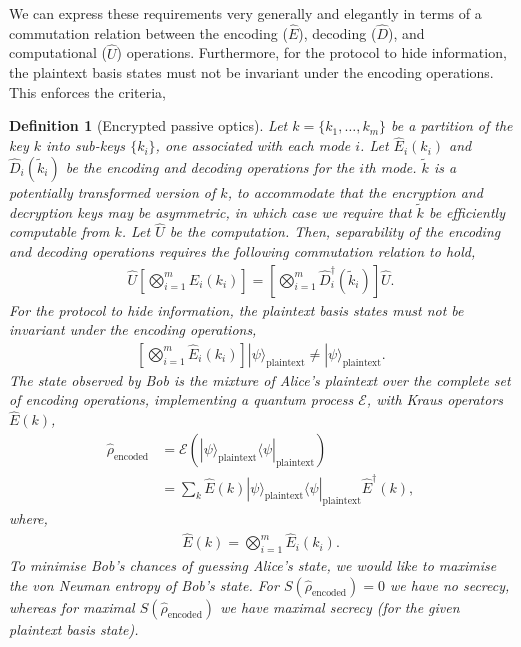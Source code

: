 \documentclass[aps, rmp, twocolumn, amsmath, amssymb, nofootinbib, superscriptaddress, longbibliography, floatfix, table-of-contents, eqsecnum]{revtex4-1}
\newcommand{\bra}[1]{\langle#1|}
\newcommand{\ket}[1]{|#1\rangle}
\newtheorem{definition}{Definition}
\begin{document}
We can express these requirements very generally and elegantly in terms of a commutation relation between the encoding ($\hat{E}$), decoding ($\hat{D}$), and computational ($\hat{U}$) operations. Furthermore, for the protocol to hide information, the plaintext basis states must not be invariant under the encoding operations. This enforces the criteria,
\begin{definition}[Encrypted passive optics] \label{def:enc_pass}
Let \mbox{$k=\{k_1,\dots,k_m\}$} be a partition of the key $k$ into sub-keys $\{k_i\}$, one associated with each mode $i$. Let $\hat{E}_i(k_i)$ and $\hat{D}_i(\tilde k_i)$ be the encoding and decoding operations for the $i$th mode. $\tilde k$ is a potentially transformed version of $k$, to accommodate that the encryption and decryption keys may be asymmetric, in which case we require that $\tilde{k}$ be efficiently computable from $k$. Let $\hat{U}$ be the computation. Then, separability of the encoding and decoding operations requires the following commutation relation to hold,
\begin{align} \label{eq:gen_pass_hom}
\hat{U} \left[\bigotimes_{i=1}^m\hat{E}_i(k_i)\right] = \left[\bigotimes_{i=1}^m\hat{D}^\dag_i(\tilde k_i)\right] \hat{U}.
\end{align}
For the protocol to hide information, the plaintext basis states must not be invariant under the encoding operations,
\begin{align}
\left[\bigotimes_{i=1}^m\hat{E}_i(k_i)\right]\ket\psi_\mathrm{plaintext} \neq \ket\psi_\mathrm{plaintext}.
\end{align}
The state observed by Bob is the mixture of Alice's plaintext over the complete set of encoding operations, implementing a quantum process $\mathcal{E}$, with Kraus operators $\hat{E}(k)$,
\begin{align} \label{eq:mix_over_enc_ops}
\hat\rho_\text{encoded} &= \mathcal{E}(\ket\psi_\mathrm{plaintext}\bra\psi_\mathrm{plaintext}) \nonumber \\
&= \sum_k \hat{E}(k)\ket\psi_\mathrm{plaintext}\bra\psi_\mathrm{plaintext} \hat{E}^\dag(k),
\end{align}
where,
\begin{align}
\hat{E}(k) = \bigotimes_{i=1}^m\hat{E}_i(k_i).
\end{align}
To minimise Bob's chances of guessing Alice's state, we would like to maximise the von Neuman entropy of Bob's state. For \mbox{$S(\hat\rho_\mathrm{encoded})=0$} we have no secrecy, whereas for maximal \mbox{$S(\hat\rho_\mathrm{encoded})$} we have maximal secrecy (for the given plaintext basis state).
\end{definition} 
\end{document}
